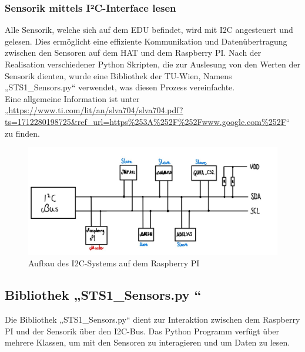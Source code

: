 \subsubsection{Sensorik mittels I²C-Interface lesen}\label{i2C}
Alle Sensorik, welche sich auf dem EDU befindet, wird mit I2C angesteuert und gelesen. Dies ermöglicht eine effiziente Kommunikation und Datenübertragung zwischen den Sensoren auf dem HAT und dem Raspberry PI. Nach der Realisation verschiedener Python Skripten, die zur Auslesung von den Werten der Sensorik dienten, wurde eine Bibliothek der TU-Wien, Namens „STS1\_Sensors.py“ verwendet, was diesen Prozess vereinfachte.\\
\vspace{3mm}
Eine allgemeine Information ist unter „\url{https://www.ti.com/lit/an/slva704/slva704.pdf?ts=1712280198725&ref_url=https%253A%252F%252Fwww.google.com%252F}“ zu finden.\\
\begin{figure}[H]
	\centering
	\includegraphics[scale=1.1]{image/constibild.jpg}
	\caption{Aufbau des I2C-Systems auf dem Raspberry PI }
\end{figure}


\subsection{Bibliothek „STS1\_Sensors.py “}\label{bib}
Die Bibliothek „STS1\_Sensors.py“ dient zur Interaktion zwischen dem Raspberry PI und der Sensorik über den I2C-Bus. Das Python Programm verfügt über mehrere Klassen, um mit den Sensoren zu interagieren und um Daten zu lesen. \\
\vspace{3mm}

